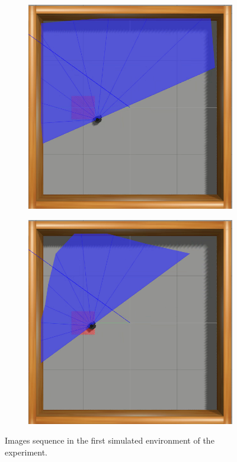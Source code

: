\begin{figure}[htbp]
\begin{subfigure}[b]{0.115\textwidth}
    \end{subfigure}
    \hfill
    \begin{subfigure}[b]{0.115\textwidth}
        \includegraphics[width=\textwidth]{images/simenv1/7.png}
    \end{subfigure}
    \hfill
    \begin{subfigure}[b]{0.115\textwidth}
        \includegraphics[width=\textwidth]{images/simenv1/8.png}
    \end{subfigure}
    \caption{Images sequence in the first simulated environment of the experiment.}\label{fig:frames_simenv1}
\end{figure}


